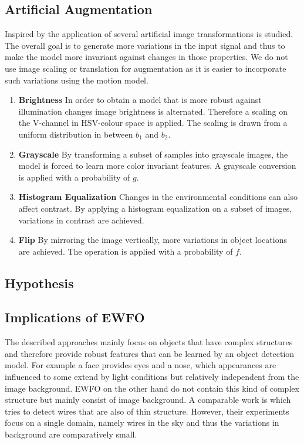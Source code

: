 \subsection{Artificial Augmentation}

Inspired by \cite{Howard2013, Redmon, Liu} the application of several artificial image transformations is studied. The overall goal is to generate more variations in the input signal and thus to make the model more invariant against changes in those properties. We do not use image scaling or translation for augmentation as it is easier to incorporate such variations using the motion model.

\begin{enumerate}
	\item \textbf{Brightness} In order to obtain a model that is more robust against illumination changes image brightness is alternated. Therefore a scaling on the V-channel in HSV-colour space is applied. The scaling is drawn from a uniform distribution in between $b_1$ and $b_2$.
	
	\item \textbf{Grayscale} By transforming a subset of samples into grayscale images, the model is forced to learn more color invariant features. A grayscale conversion is applied with a probability of $g$.
	
	\item \textbf{Histogram Equalization} Changes in the environmental conditions can also affect contrast. By applying a histogram equalization on a subset of images, variations in contrast are achieved. 
	
	\item \textbf{Flip} By mirroring the image vertically, more variations in object locations are achieved. The operation is applied with a probability of $f$.
\end{enumerate}


\subsection{Hypothesis}
\label{sec:training:hypothesis}

\subsection{Implications of \ac{EWFO}}

The described approaches mainly focus on objects that have complex structures and therefore provide robust features that can be learned by an object detection model. For example a face provides eyes and a nose, which appearances are influenced to some extend by light conditions but relatively independent from the image background. \ac{EWFO} on the other hand do not contain this kind of complex structure but mainly consist of image background. A comparable work is \cite{Madaan2017} which tries to detect wires that are also of thin structure. However, their experiments focus on a single domain, namely wires in the sky and thus the variations in background are comparatively small.

